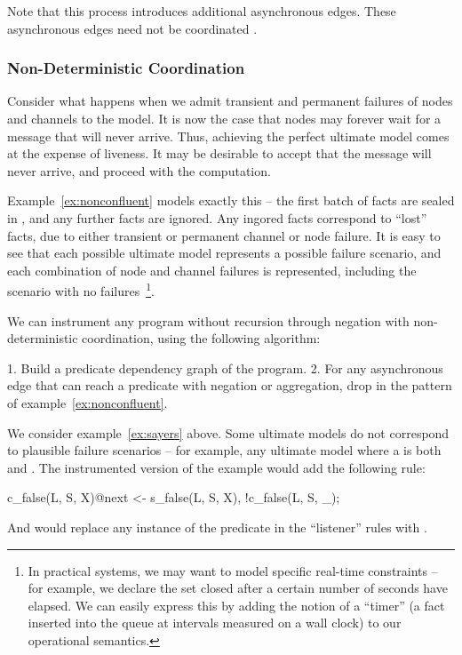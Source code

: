 Note that this process introduces additional asynchronous edges.  These asynchronous edges need not be coordinated .


\subsubsection{Non-Deterministic Coordination}

Consider what happens when we admit transient and permanent failures of nodes and channels to the model.  It is now the case that nodes may forever wait for a message that will never arrive.  Thus, achieving the perfect ultimate model comes at the expense of liveness.  It may be desirable to accept that the message will never arrive, and proceed with the computation.

Example~\ref{ex:nonconfluent} models exactly this -- the first batch of  facts are sealed in , and any further  facts are ignored.  Any ingored  facts correspond to ``lost''  facts, due to either transient or permanent channel or node failure.  It is easy to see that each possible ultimate model represents a possible failure scenario, and each combination of node and channel failures is represented, including the scenario with no failures~\footnote{In practical systems, we may want to model specific real-time constraints -- for example, we declare the set closed after a certain number of seconds have elapsed.  We can easily express this by adding the notion of a ``timer'' (a fact inserted into the queue at intervals measured on a wall clock) to our operational semantics.}.

We can instrument any \lang program without recursion through negation with non-deterministic coordination, using the following algorithm:

1. Build a predicate dependency graph of the program.
2. For any asynchronous edge that can reach a predicate with negation or aggregation, drop in the pattern of example~\ref{ex:nonconfluent}. 

We consider example~\ref{ex:sayers} above.  Some ultimate models do not correspond to plausible failure scenarios -- for example, any ultimate model where a  is both  and .  The instrumented version of the example would add the following rule:

\begin{Dedalus}
c_false(L, S, X)@next <- s_false(L, S, X),
                         !c_false(L, S, _);
\end{Dedalus}

And would replace any instance of the predicate  in the ``listener'' rules with .


